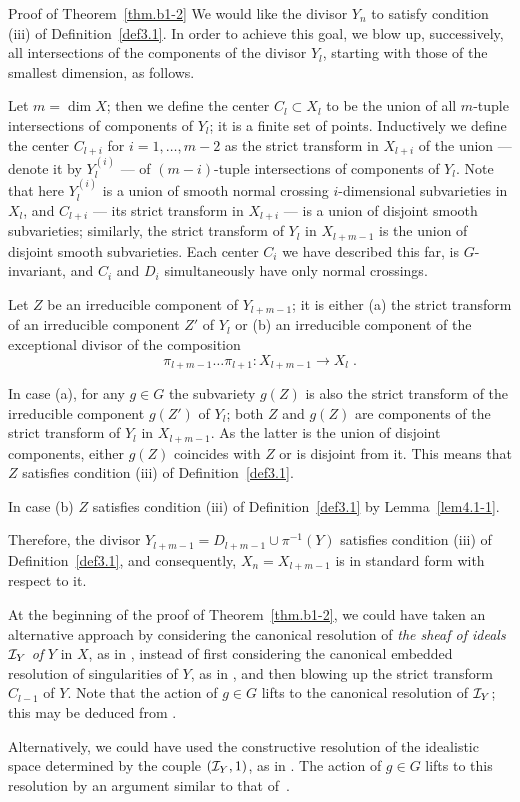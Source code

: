 \begin{pf*}{Proof of Theorem~\ref{thm.b1-2}}
We would like the divisor $Y_n$ to satisfy
condition (iii) of Definition~\ref{def3.1}. In order to achieve this goal, 
we blow up, successively, all intersections of the components 
of the divisor $Y_l$, starting with those of the smallest dimension, as follows.

Let $m=\dim X$; then we define the center $C_{l}\subset X_l$ to be the
union of all $m$-tuple intersections of components of $Y_l$; it is a
finite set of points.
Inductively we define the center $C_{l+i}$ for
$i=1,\dots,m-2$ as the strict transform in $X_{l+i}$ of the union --- denote
it by $Y_l^{(i)}$ --- of $(m-i)$-tuple intersections of
components of $Y_l$.  Note that here $Y_l^{(i)}$ is a
union of smooth normal crossing $i$-dimensional subvarieties 
in $X_l$, and $C_{l+i}$ --- its strict
transform in $X_{l+i}$ --- is a union of disjoint smooth subvarieties;
similarly, the strict transform of $Y_l$ in $X_{l+m-1}$ is
the union of disjoint smooth subvarieties.
Each center $C_i$ we have described this far, is $G$-invariant, and
$C_i$ and $D_{i}$ simultaneously have only normal crossings.

Let $Z$ be an irreducible component of $Y_{l+m-1}$; it is
either (a) the strict transform of an irreducible component $Z'$ 
of $Y_l$ or (b) an irreducible
component of the exceptional divisor of the composition
\[ \pi_{l+m-1}\dots\pi_{l+1}\colon X_{l+m-1}\to X_l \; . \]

In case (a), for any $g\in G$ the subvariety $g(Z)$ is also the strict
transform of the irreducible component $g(Z')$ of $Y_l$; both $Z$ and
$g(Z)$ are components of the strict transform of $Y_l$ in $X_{l+m-1}$.
As the latter is the union of disjoint components,
either $g(Z)$ coincides with $Z$ or is disjoint from it. This means that
$Z$ satisfies condition (iii) of Definition~\ref{def3.1}.

In case (b) $Z$ satisfies condition (iii) of Definition~\ref{def3.1} by
Lemma~\ref{lem4.1-1}.

Therefore, the divisor $Y_{l+m-1}=D_{l+m-1}\cup\pi^{-1}(Y)$
satisfies condition (iii) of Definition~\ref{def3.1}, and consequently,
$X_n=X_{l+m-1}$ is in standard form with respect to it.
\end{pf*}

\begin{remark}
At the beginning of the proof of Theorem~\ref{thm.b1-2}, we could have 
taken an alternative approach by considering 
the canonical resolution of {\em the sheaf of ideals ${\cal I}_Y$
of\/} $Y$ in $X$, as in \cite[Theorem~1.10]{bm}, instead of first considering
the canonical embedded resolution of singularities of $Y$, 
as in \cite[Theorem~1.6]{bm}, and then blowing up the strict 
transform $C_{l-1}$ of $Y$. Note that the action of $g\in G$ lifts 
to the canonical resolution of ${\cal I}_Y$; this may be deduced from
\cite[Remark~1.5]{bm}. 

Alternatively, we could have used the constructive resolution of 
the idealistic space determined by the couple $({\cal I}_Y,1)$, 
as in \cite[Definition 2.4.1 and Theorem~7.3]{Vil2}.
The action of $g\in G$ lifts to this resolution by an argument
similar to that of~\cite[Corollary~7.6.3]{Vil2}.
\end{remark}

